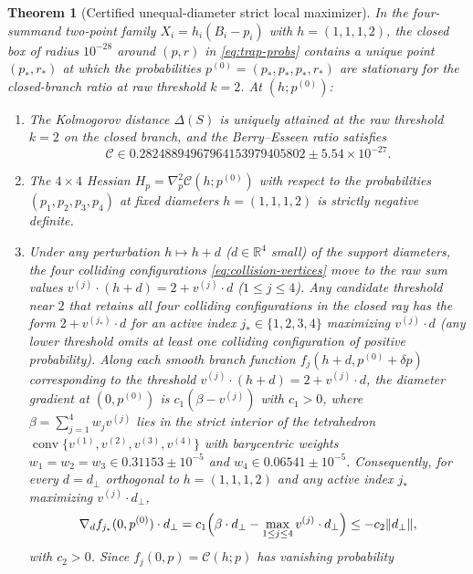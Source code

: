 \documentclass[11pt]{article}
\numberwithin{equation}{section}
\newtheorem{theorem}{Theorem}[section]
\theoremstyle{definition}
\theoremstyle{remark}
\newcommand{\R}{\mathbb R}
\begin{document}
\begin{theorem}[Certified unequal-diameter strict local maximizer]\label{thm:local-trap}
In the four-summand two-point family $X_i=h_i(B_i-p_i)$ with $h=(1,1,1,2)$,
the closed box of radius $10^{-28}$ around $(p,r)$ in \eqref{eq:trap-probs}
contains a unique point $(p_*,r_*)$ at which the probabilities
$p^{(0)}=(p_*,p_*,p_*,r_*)$ are stationary for the closed-branch ratio at raw
threshold $k=2$. At $(h;p^{(0)})$:
\begin{enumerate}[label=(\roman*),leftmargin=2em]
\item The Kolmogorov distance $\Delta(S)$ is uniquely attained at the raw
threshold $k=2$ on the closed branch, and the Berry--Esseen ratio satisfies
\begin{equation}\label{eq:trap-ratio}
 \mathcal C\in 0.28248894967964153979405802\pm 5.54\times10^{-27}.
\end{equation}
\item The $4\times4$ Hessian $H_p=\nabla_p^2\mathcal C(h;p^{(0)})$ with
respect to the probabilities $(p_1,p_2,p_3,p_4)$ at fixed diameters
$h=(1,1,1,2)$ is strictly negative definite.
\item Under any perturbation $h\mapsto h+d$ ($d\in\R^4$ small) of the support
diameters, the four colliding configurations \eqref{eq:collision-vertices} move
to the raw sum values $v^{(j)}\cdot(h+d)=2+v^{(j)}\cdot d$ ($1\le j\le 4$). Any
candidate threshold near $2$ that retains all four colliding configurations in
the closed ray has the form $2+v^{(j_*)}\cdot d$ for an active index
$j_*\in\{1,2,3,4\}$ maximizing $v^{(j)}\cdot d$ (any lower threshold omits at
least one colliding configuration of positive probability). Along each smooth
branch function $f_j(h+d,p^{(0)}+\delta p)$ corresponding to the threshold
$v^{(j)}\cdot(h+d)=2+v^{(j)}\cdot d$, the diameter gradient at $(0,p^{(0)})$ is
$c_1(\beta-v^{(j)})$ with $c_1>0$, where $\beta=\sum_{j=1}^4 w_j v^{(j)}$ lies
in the strict interior of the tetrahedron
$\operatorname{conv}\{v^{(1)},v^{(2)},v^{(3)},v^{(4)}\}$ with barycentric
weights $w_1=w_2=w_3\in 0.31153\pm 10^{-5}$ and $w_4\in 0.06541\pm 10^{-5}$.
Consequently, for every $d=d_\perp$ orthogonal to $h=(1,1,1,2)$ and any active
index $j_*$ maximizing $v^{(j)}\cdot d_\perp$,
\begin{equation}\label{eq:trap-cusp}
 \nabla_d f_{j_*}(0,p^{(0)})\cdot d_\perp
 =c_1\Bigl(\beta\cdot d_\perp-\max_{1\le j\le 4}v^{(j)}\cdot d_\perp\Bigr)
 \le -c_2\|d_\perp\|,
\end{equation}
with $c_2>0$. Since $f_j(0,p)=\mathcal C(h;p)$ has vanishing probability

\end{enumerate}
\end{theorem}
\end{document}
